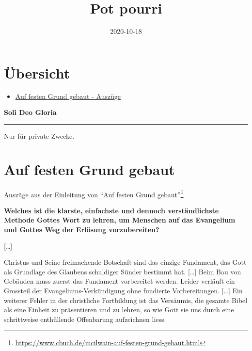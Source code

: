 \documentclass[
  12pt,
]{krantz}
\title{Pot pourri}
\author{}
\date{\vspace{-2.5em}2020-10-18}
\makeatletter
\providecommand{\tightlist}{%
  \setlength{\itemsep}{0pt}\setlength{\parskip}{0pt}}
\newenvironment{kframe}{%
\medskip{}
\setlength{\fboxsep}{.8em}
 \def\at@end@of@kframe{}%
 \ifinner\ifhmode%
  \def\at@end@of@kframe{\end{minipage}}%
  \begin{minipage}{\columnwidth}%
 \fi\fi%
 \def\FrameCommand##1{\hskip\@totalleftmargin \hskip-\fboxsep
 \colorbox{shadecolor}{##1}\hskip-\fboxsep
     \hskip-\linewidth \hskip-\@totalleftmargin \hskip\columnwidth}%
 \MakeFramed {\advance\hsize-\width
   \@totalleftmargin\z@ \linewidth\hsize
   \@setminipage}}%
 {\par\unskip\endMakeFramed%
 \at@end@of@kframe}
\newenvironment{rmdblock}[1]
  {
  \begin{itemize}
  \renewcommand{\labelitemi}{
    \raisebox{-.7\height}[0pt][0pt]{
      {\setkeys{Gin}{width=3em,keepaspectratio}\texttt{[image: img/\#1]}}
    }
  }
  \setlength{\fboxsep}{1em}
  \begin{kframe}
  \item
  }
  {
  \end{kframe}
  \end{itemize}
  }
\newenvironment{rmdinfo}
  {\begin{rmdblock}{caution}}
  {\end{rmdblock}}
\renewcommand{\href}[2]{#2\footnote{\url{#1}}}
\makeatother
\begin{document}
\maketitle

\thispagestyle{empty}
\mainmatter

{
\hypersetup{linkcolor=}
\setcounter{tocdepth}{2}
\tableofcontents
}
\hypertarget{uxfcbersicht}{%
\chapter{Übersicht}\label{uxfcbersicht}}

\begin{itemize}
\tightlist
\item
  \protect\hyperlink{auf-festen-grund-gebaut}{Auf festen Grund gebaut - Auszüge}
\end{itemize}

\begin{rmdinfo}
\textbf{Soli Deo Gloria}
\end{rmdinfo}

\begin{center}\rule{0.5\linewidth}{0.5pt}\end{center}

Nur für private Zwecke.

\hypertarget{auf-festen-grund-gebaut}{%
\chapter{Auf festen Grund gebaut}\label{auf-festen-grund-gebaut}}

Auszüge aus der Einleitung von \href{https://www.cbuch.de/mcilwain-auf-festen-grund-gebaut.html}{``Auf festen Grund gebaut''}

\textbf{Welches ist die klarste, einfachste und dennoch verständlichste Methode
Gottes Wort zu lehren, um Menschen auf das Evangelium und Gottes Weg der
Erlösung vorzubereiten?}

{[}\ldots{]}

Christus und Seine freimachende Botschaft sind das einzige Fundament, das
Gott als Grundlage des Glaubens schuldiger Sünder bestimmt hat. {[}\ldots{]} Beim Bau
von Gebäuden muss zuerst das Fundament vorbereitet werden. Leider verläuft
ein Grossteil der Evangeliums-Verkündigung ohne fundierte Vorbereitungen. {[}\ldots{]}
Ein weiterer Fehler in der christliche Fortbildung ist das Versäumis, die
gesamte Bibel als eine Einheit zu präsentieren und zu lehren, so wie Gott
sie uns durch eine schrittweise enthüllende Offenbarung aufzeichnen liess.
\end{document}
